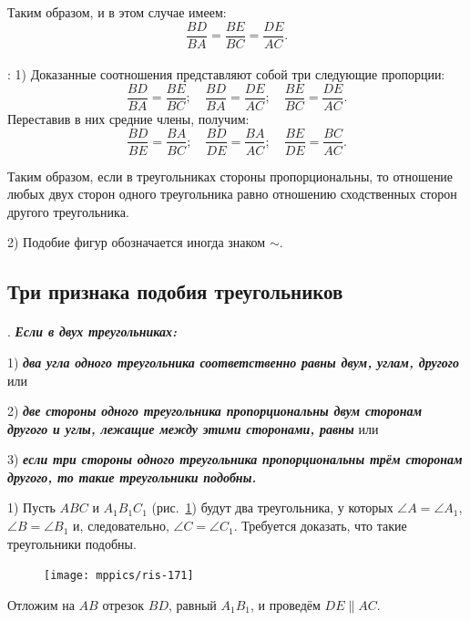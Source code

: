 \documentclass[oneside]{book}
\begin{document}
Таким образом, и в этом случае имеем:
\[\frac{BD}{BA}=\frac{BE}{BC}=\frac{DE}{AC}.\]


\paragraph{}\label{1938/160}
:
1) Доказанные соотношения представляют собой три следующие пропорции:
\[\frac{BD}{BA}=\frac{BE}{BC};
\quad
\frac{BD}{BA}=\frac{DE}{AC};
\quad
\frac{BE}{BC}=\frac{DE}{AC}.\]
Переставив в них средние члены, получим:
\[\frac{BD}{BE}=\frac{BA}{BC};
\quad
\frac{BD}{DE}=\frac{BA}{AC};
\quad
\frac{BE}{DE}=\frac{BC}{AC}.\]

Таким образом, если в треугольниках стороны пропорциональны, то отношение любых двух сторон одного треугольника равно отношению сходственных сторон другого треугольника.

2) Подобие фигур обозначается иногда знаком $\sim$.

\subsection*{Три признака подобия треугольников}

\paragraph{}\label{1938/161}
.
\textbf{\emph{Если в двух треугольниках:}}

1) \textbf{\emph{два угла одного треугольника соответственно равны двум, углам, другого}} или

2) \textbf{\emph{две стороны одного треугольника пропорциональны двум сторонам другого и углы, лежащие между этими сторонами, равны}} или

3) \textbf{\emph{если три стороны одного треугольника пропорциональны трём сторонам другого, то такие треугольники подобны.}}

1) Пусть $ABC$ и $A_1B_1C_1$ (рис.~\ref{1938/ris-171}) будут два треугольника, у которых $\angle A = \angle A_1$, $\angle B=\angle B_1$ и, следовательно, $\angle C=\angle C_1$.
Требуется доказать, что такие треугольники подобны.

\begin{figure}[h!]
\centering
\texttt{[image: mppics/ris-171]}
\caption{}\label{1938/ris-171}
\end{figure}

Отложим на $AB$ отрезок $BD$, равный $A_1B_1$, и проведём $DE\parallel AC$.
\end{document}
